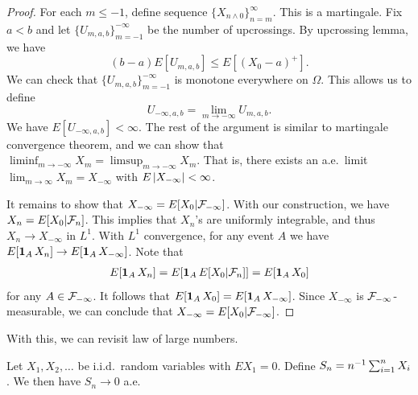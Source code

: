 \documentclass[a4paper]{article}
\begin{document}
\begin{proof}
  For each $m \leq -1$, define sequence $\{ X_{n \wedge 0} \}_{n = m}^\infty$.
  This is a martingale. Fix $a < b$ and let $\{ U_{m, a, b} \}_{m=-1}^{-\infty}$ 
  be the number of upcrossings. By upcrossing lemma, we have 
  \[
  (b - a) E[ U_{m, a, b} ] \leq E [(X_0 - a)^+].
  \]
  We can check that $\{ U_{m, a, b} \}_{m=-1}^{-\infty}$ is monotone 
  everywhere on $\Omega$. This allows us to define 
  \[
  U_{-\infty, a, b} = \lim_{m \to -\infty} U_{m, a, b}.
  \]
  We have $E[ U_{-\infty, a, b} ]< \infty$. The rest of the argument
  is similar to martingale convergence theorem, and we can show 
  that $\liminf_{m \to -\infty} X_m = \limsup_{m \to -\infty} X_m$.
  That is, there exists an a.e.\ limit $\lim_{m \to \infty} X_m = 
  X_{-\infty}$ with $E \left\lvert X_{-\infty}\right\rvert < \infty$.

  It remains to show that 
  $X_{- \infty} = E [X_0 | \mathcal{F}_{-\infty}]$. 
  With our construction, we have $X_n = E[X_0 | \mathcal{F}_n]$.
  This implies that $X_n$'s are uniformly integrable, and thus 
  $X_n \to X_{-\infty}$ in $L^1$. 
  With $L^1$ convergence, for any event $A$ we have 
  $E[\operatorname{\mathbf{1}}_A X_n] \to E[\operatorname{\mathbf{1}}_A X_{-\infty}]$. Note that 
  \begin{align*}
    E[\operatorname{\mathbf{1}}_A X_n] = E [\operatorname{\mathbf{1}}_A E[X_0 | \mathcal{F}_n]] = E [\operatorname{\mathbf{1}}_A X_0]
  \end{align*} 
  for any $A \in \mathcal{F}_{-\infty}$. It follows that
  $E[\operatorname{\mathbf{1}}_A X_0] = E[\operatorname{\mathbf{1}}_A X_{-\infty}]$. Since $X_{-\infty}$
  is $\mathcal{F}_{-\infty}$-measurable, we can conclude that 
  $X_{-\infty} = E[X_0 | \mathcal{F}_{-\infty}]$.

\end{proof}


With this, we can revisit law of large numbers.
\begin{thm}
  Let $X_1, X_2, \dots$ be i.i.d.\ random variables with $E X_1 = 0$. 
  Define $S_n = n^{-1} \sum_{i=1}^n X_i$. We then have 
  $S_n \to 0$ a.e.
\end{thm}
\end{document}
